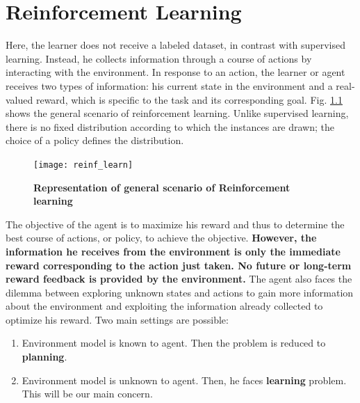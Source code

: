\chapter{Reinforcement Learning}
Here, the learner does not receive a labeled dataset, in contrast with supervised learning. Instead, he collects information through a course of actions by interacting with the environment. In response to an action, the learner or agent receives two types of information: his current state in the environment and a real-valued reward, which is specific to the task and its corresponding goal. Fig. \ref{fig:reinf_learn} shows the general scenario of reinforcement learning. Unlike supervised learning, there is no fixed distribution according to which the instances are drawn; the choice of a policy defines the distribution.

\begin{figure}[h]
\centering
\texttt{[image: reinf\_learn]}
\caption[width=\textwidth]{\textbf{Representation of general scenario of Reinforcement learning}}
\label{fig:reinf_learn}
\end{figure}

The objective of the agent is to maximize his reward and thus to determine the best course of actions, or policy, to achieve the objective. \textbf{However, the information he receives from the environment is only the immediate reward corresponding to the action just taken. No future or long-term reward feedback is provided by the environment.} The agent also faces the dilemma between exploring unknown states and actions to gain more information about the environment and exploiting the information already collected to optimize his reward. Two main settings are possible:
\begin{enumerate}
    \item Environment model is known to agent. Then the problem is reduced to \textbf{planning}.
    \item Environment model is unknown to agent. Then, he faces \textbf{learning} problem. This will be our main concern.
\end{enumerate}


